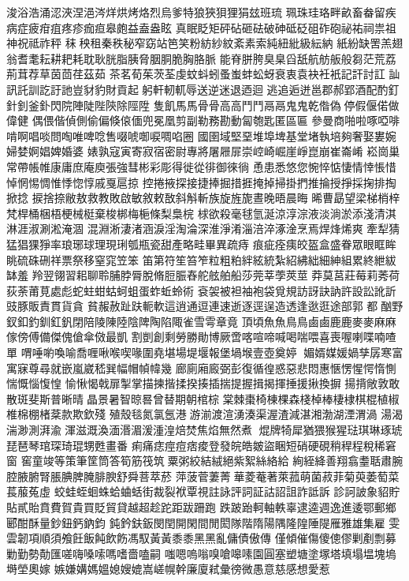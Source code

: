 浚浴浩涌涊浹涅浥涔烊烘烤烙烈烏爹特狼狹狽狸狷玆班琉
珮珠珪珞畔畝畜畚留疾病症疲疳疽疼疹痂疸皋皰益盍盎眩
真眠眨矩砰砧砸砝破砷砥砭砠砟砲祕祐祠祟祖神祝祗祚秤
秣秧租秦秩秘窄窈站笆笑粉紡紗紋紊素索純紐紕級紜納
紙紛缺罟羔翅翁耆耄耘耕耙耗耽耿胱脂胰脅胭胴脆胸胳脈
能脊胼胯臭臬舀舐航舫舨般芻茫荒荔荊茸荐草茵茴荏茲茹
茶茗荀茱茨荃虔蚊蚪蚓蚤蚩蚌蚣蚜衰衷袁袂衽衹記訐討訌
訕訊託訓訖訏訑豈豺豹財貢起躬軒軔軏辱送逆迷退迺迴
逃追逅迸邕郡郝郢酒配酌釘針釗釜釙閃院陣陡陛陝除陘陞
隻飢馬⾺骨⾻高⾼⾾鬥鬲⿀鬼⿁乾偺偽停假偃偌做偉健
偶偎偕偵側偷偏倏偯偭兜冕凰剪副勒務勘動匐匏匙匿區匾
參曼商啪啦啄啞啡啃啊唱啖問啕唯啤唸售啜唬啣唳啁啗圈
國圉域堅堊堆埠埤基堂堵執培夠奢娶婁婉婦婪婀娼婢婚婆
婊孰寇寅寄寂宿密尉專將屠屜屝崇崆崎崛崖崢崑崩崔崙崤
崧崗巢常帶帳帷康庸庶庵庾張強彗彬彩彫得徙從徘御徠徜
恿患悉悠您惋悴惦悽情悻悵惜悼惘惕惆惟悸惚惇戚戛扈掠
控捲掖探接捷捧掘措捱掩掉掃掛捫推掄授掙採掬排掏掀捻
捩捨捺敝敖救教敗啟敏敘敕敔斜斛斬族旋旌旎晝晚晤晨晦
晞曹勗望梁梯梢梓梵桿桶梱梧梗械梃棄梭梆梅梔條梨梟梡
梂欲殺毫毬氫涎涼淳淙液淡淌淤添淺清淇淋涯淑涮淞淹涸
混淵淅淒渚涵淚淫淘淪深淮淨淆淄涪淬涿淦烹焉焊烽烯爽
牽犁猜猛猖猓猙率琅琊球理現琍瓠瓶瓷甜產略畦畢異疏痔
痕疵痊痍皎盔盒盛眷眾眼眶眸眺硫硃硎祥票祭移窒窕笠笨
笛第符笙笞笮粒粗粕絆絃統紮紹紼絀細紳組累終紲紱缽羞
羚翌翎習耜聊聆脯脖脣脫脩脰脤舂舵舷舶船莎莞莘荸莢莖
莽莫莒莊莓莉莠荷荻荼莆莧處彪蛇蛀蚶蛄蚵蛆蛋蚱蚯蛉術
袞袈被袒袖袍袋覓規訪訝訣訥許設訟訛訢豉豚販責貫貨貪
貧赧赦趾趺軛軟這逍通逗連速逝逐逕逞造透逢逖逛途部郭
都酗野釵釦釣釧釭釩閉陪陵陳陸陰陴陶陷陬雀雪雩章竟
頂頃魚⿂鳥⿃鹵⿄鹿⿅麥⿆麻⿇傢傍傅備傑傀傖傘傚最凱
割剴創剩勞勝勛博厥啻喀喧啼喊喝喘喂喜喪喔喇喋喃喳單
喟唾喲喚喻喬喱啾喉喫喙圍堯堪場堤堰報堡堝堠壹壺奠婷
媚婿媒媛媧孳孱寒富寓寐尊尋就嵌嵐崴嵇巽幅帽幀幃幾
廊廁廂廄弼彭復循徨惑惡悲悶惠愜愣惺愕惰惻惴慨惱愎惶
愉愀愒戟扉掣掌描揀揩揉揆揍插揣提握揖揭揮捶援揪換摒
揚揹敞敦敢散斑斐斯普晰晴晶景暑智晾晷曾替期朝棺棕
棠棘棗椅棟棵森棧棹棒棲棣棋棍植椒椎棉棚楮棻款欺欽殘
殖殼毯氮氯氬港游湔渡渲湧湊渠渥渣減湛湘渤湖湮渭渦
湯渴湍渺測湃渝渾滋溉渙湎湣湄湲湩湟焙焚焦焰無然煮
焜牌犄犀猶猥猴猩琺琪琳琢琥琵琶琴琯琛琦琨甥甦畫番
痢痛痣痙痘痞痠登發皖皓皴盜睏短硝硬硯稍稈程稅稀窘窗
窖童竣等策筆筐筒答筍筋筏筑粟粥絞結絨絕紫絮絲絡給
絢絰絳善翔翕耋聒肅腕腔腋腑腎脹腆脾腌腓腴舒舜菩萃菸
萍菠菅萋菁華菱菴著萊菰萌菌菽菲菊萸萎萄菜萇菔菟虛
蛟蛙蛭蛔蛛蛤蛐蛞街裁裂袱覃視註詠評詞証詁詔詛詐詆訴
診訶詖象貂貯貼貳貽賁費賀貴買貶貿貸越超趁跎距跋跚跑
跌跛跆軻軸軼辜逮逵週逸進逶鄂郵鄉郾酣酥量鈔鈕鈣鈉鈞
鈍鈐鈇鈑閔閏開閑間閒閎隊階隋陽隅隆隍陲隄雁雅雄集雇
雯雲韌項順須飧飪飯飩飲飭馮馭黃⿈黍⿉黑⿊亂傭債傲傳
僅傾催傷傻傯僇剿剷剽募勦勤勢勣匯嗟嗨嗓嗦嗎嗜嗇嗑嗣
嗤嗯嗚嗡嗅嗆嗥嗉園圓塞塑塘塗塚塔填塌塭塊塢塒塋奧嫁
嫉嫌媾媽媼媳嫂媲嵩嵯幌幹廉廈弒彙徬微愚意慈感想愛惹
